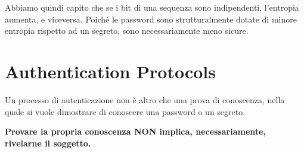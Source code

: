 \begin{remark}
Abbiamo quindi capito che se i bit di una sequenza sono indipendenti, l'entropia aumenta, e viceversa. Poiché le password sono strutturalmente dotate di minore entropia rispetto ad un segreto, sono necessariamente meno sicure.
\end{remark}
\section{Authentication Protocols}
Un processo di autenticazione non è altro che una prova di conoscenza, nella quale si vuole dimostrare di conoscere una password o un segreto. 
\begin{remark}
\textbf{Provare la propria conoscenza NON implica, necessariamente, rivelarne il soggetto.}
\end{remark}
